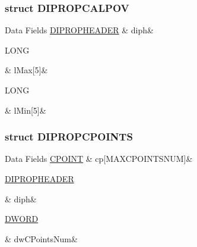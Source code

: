 \subsubsection{struct D\-I\-P\-R\-O\-P\-C\-A\-L\-P\-O\-V}
\begin{DoxyFields}{Data Fields}
\hypertarget{a00003_a7010842dfbdaa5bb4357503558202537}{\hyperlink{a00003_d0/d61/a00100}{D\-I\-P\-R\-O\-P\-H\-E\-A\-D\-E\-R}}\label{a00003_a7010842dfbdaa5bb4357503558202537}
&
diph&
\\
\hline

\hypertarget{a00003_af824b5c10a789504ab6c65d3026f35da}{L\-O\-N\-G}\label{a00003_af824b5c10a789504ab6c65d3026f35da}
&
l\-Max\mbox{[}5\mbox{]}&
\\
\hline

\hypertarget{a00003_a1b509581885f85fb8678fdddb28b22bc}{L\-O\-N\-G}\label{a00003_a1b509581885f85fb8678fdddb28b22bc}
&
l\-Min\mbox{[}5\mbox{]}&
\\
\hline

\end{DoxyFields}
\label{d1/d84/a00097}
\hypertarget{a00003_d1/d84/a00097}{}
\subsubsection{struct D\-I\-P\-R\-O\-P\-C\-P\-O\-I\-N\-T\-S}
\begin{DoxyFields}{Data Fields}
\hypertarget{a00003_a19f51a3f9633b843d2324e45f9aa93c4}{\hyperlink{a00003_d2/d79/a00051}{C\-P\-O\-I\-N\-T}}\label{a00003_a19f51a3f9633b843d2324e45f9aa93c4}
&
cp\mbox{[}M\-A\-X\-C\-P\-O\-I\-N\-T\-S\-N\-U\-M\mbox{]}&
\\
\hline

\hypertarget{a00003_a7010842dfbdaa5bb4357503558202537}{\hyperlink{a00003_d0/d61/a00100}{D\-I\-P\-R\-O\-P\-H\-E\-A\-D\-E\-R}}\label{a00003_a7010842dfbdaa5bb4357503558202537}
&
diph&
\\
\hline

\hypertarget{a00003_a03dae485499a864d4ec3cf6a4af0962d}{\hyperlink{a00003_a50e15ae51c87ae06ab29c8148cb5f36c}{D\-W\-O\-R\-D}}\label{a00003_a03dae485499a864d4ec3cf6a4af0962d}
&
dw\-C\-Points\-Num&
\\
\hline

\end{DoxyFields}
\label{d1/d44/a00098}
\hypertarget{a00003_d1/d44/a00098}{}
